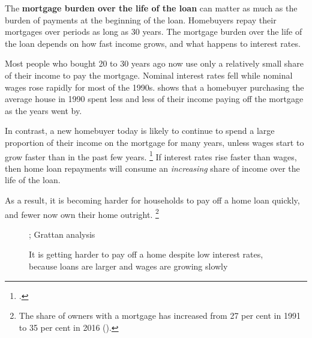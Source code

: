 The \textbf{mortgage burden over the life of the loan} can matter as much as the burden of payments at the beginning of the loan.
Homebuyers repay their mortgages over periods as long as 30 years.
The mortgage burden over the life of the loan depends on how fast income grows, and what happens to interest rates.

Most people who bought 20 to 30 years ago now use only a relatively small share of their income to pay the mortgage.
Nominal interest rates fell while nominal wages rose rapidly for most of the 1990s.  shows that a homebuyer purchasing the average house in 1990 spent less and less of their income paying off the mortgage as the years went by.

In contrast, a new homebuyer today is likely to continue to spend a large proportion of their income on the mortgage for many years, unless wages start to grow faster than in the past few years.%
	\footcites{Jacobs2015Whyiswage}{BishopCassidy2017insights}[][Figure~6]{Simon-Stone-2017-Property-Ladder}{Lowe-2017-Speech-RBA-Dinner}
If interest rates rise faster than wages, then home loan repayments will consume an \emph{increasing} share of income over the life of the loan.

As a result, it is becoming harder for households to pay off a home loan quickly, and fewer now own their home outright.%
	\footnote{The share of owners with a mortgage has increased from 27 per cent in 1991 to 35 per cent in 2016 (\textcites{ABS20016Censuspopulationhousing}{Kryger2009HomeOwnershipinAustralia}).}


\begin{figure}
\caption{It is getting harder to pay off a home despite low interest rates, because loans are larger and wages are growing slowly}\label{fig:mortgage-tilt}
%
{\textcites{ABS-SIH-201314}{ABS-2017-Residential}{ABS-WagePriceIndex-Jun2017}{ABS-Avg-weekly-earnings-May2017}{BankforIS-2017-longseries}{RBA2017selectedratios-e2}; Grattan analysis}
\end{figure}

